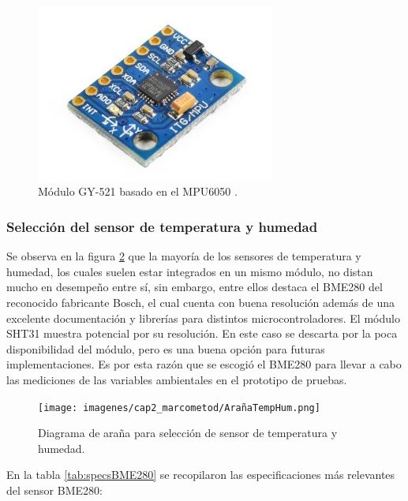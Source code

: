 \begin{figure}[H]
    \centering
    \includegraphics[width = 0.7\textwidth]{imagenes/cap2_marcometod/MPU6050BREAKOUT.jpg}
    \caption{Módulo GY-521 basado en el MPU6050 \citep{mpu6050}.}
    \label{fig:mpu6050}
\end{figure}


\subsubsection{Selección del sensor de temperatura y humedad}

Se observa en la figura \ref{fig:arañatemphum} que la mayoría de los sensores de temperatura y humedad, los cuales suelen estar integrados en un mismo módulo, no distan mucho en desempeño entre sí, sin embargo, entre ellos destaca el BME280 del reconocido fabricante Bosch, el cual cuenta con buena resolución además de una excelente documentación y librerías para distintos microcontroladores. El módulo SHT31 muestra potencial por su resolución. En este caso se descarta por la poca disponibilidad del módulo, pero es una buena opción para futuras implementaciones. Es por esta razón que se escogió el BME280 para llevar a cabo las mediciones de las variables ambientales en el prototipo de pruebas.

\begin{figure}[H]
    \centering
    \texttt{[image: imagenes/cap2\_marcometod/ArañaTempHum.png]}
    \caption{Diagrama de araña para selección de sensor de temperatura y humedad.}
    \label{fig:arañatemphum}
\end{figure}

En la tabla \ref{tab:specsBME280} se recopilaron las especificaciones más relevantes del sensor BME280:

